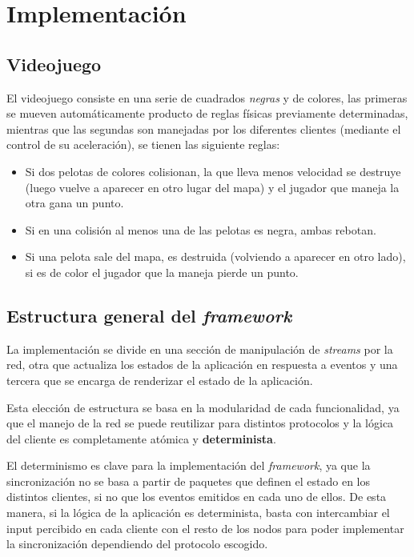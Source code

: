 \section{Implementación}

\subsection{Videojuego}

El videojuego consiste en una serie de cuadrados \emph{negras} y de colores, las primeras se mueven automáticamente producto de reglas físicas previamente determinadas, mientras que las segundas son manejadas por los diferentes clientes (mediante el control de su aceleración), se tienen las siguiente reglas:

\begin{itemize}
\item Si dos pelotas de colores colisionan, la que lleva menos velocidad se destruye (luego vuelve a aparecer en otro lugar del mapa) y el jugador que maneja la otra gana un punto.
\item Si en una colisión al menos una de las pelotas es negra, ambas rebotan.
\item Si una pelota sale del mapa, es destruida (volviendo a aparecer en otro lado), si es de color el jugador que la maneja pierde un punto.
\end{itemize}

\subsection{Estructura general del \emph{framework}}

La implementación se divide en una sección de manipulación de \emph{streams} por la red, otra que actualiza los estados de la aplicación en respuesta a eventos y una tercera que se encarga de renderizar el estado de la aplicación.

Esta elección de estructura se basa en la modularidad de cada funcionalidad, ya que el manejo de la red se puede reutilizar para distintos protocolos y la lógica del cliente es completamente atómica y \textbf{determinista}.

El determinismo es clave para la implementación del \emph{framework}, ya que la sincronización no se basa a partir de paquetes que definen el estado en los distintos clientes, si no que los eventos emitidos en cada uno de ellos. De esta manera, si la lógica de la aplicación es determinista, basta con intercambiar el input percibido en cada cliente con el resto de los nodos para poder implementar la sincronización dependiendo del protocolo escogido.


